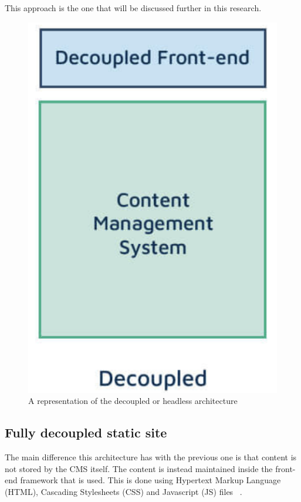 This approach is the one that will be discussed further in this research.

\begin{figure}
	\centering
	\includegraphics{./img/Headless_Architecture}
	\caption[Headless CMS architecture]{A representation of the decoupled or headless architecture ~\autocite{Dropsolid2021}}
\end{figure}


\subsection{Fully decoupled static site}

The main difference this architecture has with the previous one is that content is not stored by the CMS itself. The content is instead maintained inside the front-end framework that is used. This is done using Hypertext Markup Language (HTML), Cascading Stylesheets (CSS) and Javascript (JS) files ~\autocite{Dropsolid2021}.

